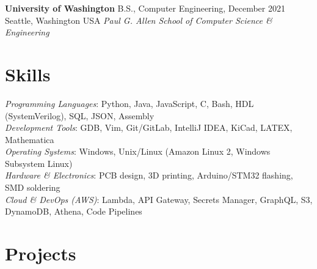 \documentclass[margin,line]{res}
\newenvironment{list1}{
  \begin{list}{\ding{113}}{%
      \setlength{\itemsep}{0in}
      \setlength{\parsep}{0in} \setlength{\parskip}{0in}
      \setlength{\topsep}{0in} \setlength{\partopsep}{0in} 
      \setlength{\leftmargin}{0.17in}}}{\end{list}}
\begin{document}
\begin{resume}
{\bf University of Washington} \hfill B.S., Computer Engineering, December 2021 \\
Seattle, Washington USA \hfill {\em Paul G. Allen School of Computer Science \& Engineering} \\



\section{\sc Skills} %
    {\em Programming Languages}:
    Python, Java, JavaScript, C, Bash, HDL (SystemVerilog), SQL, JSON, Assembly
    \\
    {\em Development Tools}:
    GDB, Vim, Git/GitLab, IntelliJ IDEA, KiCad, LATEX, Mathematica
    \\
    {\em Operating Systems}:
    Windows, Unix/Linux (Amazon Linux 2, Windows Subsystem Linux)
    \\
    {\em Hardware \& Electronics}:
    PCB design, 3D printing, Arduino/STM32 flashing, SMD soldering
    \\
    {\em Cloud \& DevOps (AWS)}:
    Lambda, API Gateway, Secrets Manager, GraphQL, S3, DynamoDB, Athena, Code Pipelines

\section{\sc Projects }


\end{resume}
\end{document}
